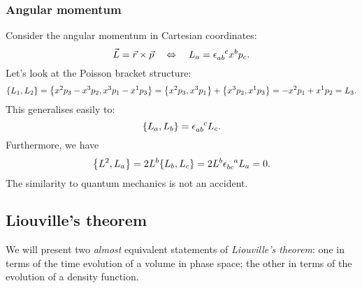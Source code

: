 \documentclass{article}
\begin{document}
\subsubsection*{Angular momentum}
Consider the angular momentum in Cartesian coordinates:
\[
	\vec{L} = \vec{r} \times \vec{p} \equivalent L_{a} = \epsilon\indices{_{ab}^{c}} x^{b} p_{c}.
\]
Let's look at the Poisson bracket structure:
\[
	\qty{L_{1}, L_{2}} = \qty{x^{2}p_{3} - x^{3}p_{2}, x^{3}p_{1} - x^{1}p_{3}} = \qty{x^{2}p_{3}, x^{3}p_{1}} + \qty{x^{3}p_{2}, x^{1}p_{3}} = -x^{2}p_{1} + x^{1}p_{2} = L_{3}.
\]
This generalises easily to:
\[
	\qty{L_{a}, L_{b}} = \epsilon\indices{_{ab}^{c}} L_{c}.
\]
Furthermore, we have
\[
	\qty{L^{2}, L_{a}} = 2  L^{b} \qty{L_{b}, L_{c}} = 2 L^{b} \epsilon\indices{_{bc}^{a}} L_{a} = 0.
\]
The similarity to quantum mechanics is not an accident.
\subsection{Liouville's theorem}
We will present two \textit{almost} equivalent statements of \textit{Liouville's theorem}: one in terms of the time evolution of a volume in phase space; the other in terms of the evolution of a density function. 
\end{document}
